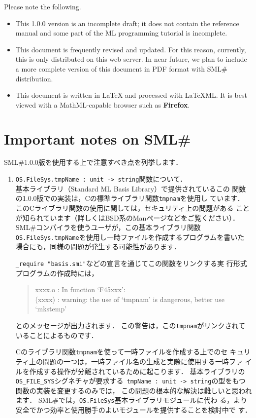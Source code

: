 \documentclass{jbook}
\newcommand{\txt}[2]{#2}
\newcommand{\smlsharp}{SML\#}
\newcommand{\version}{1.0.0}
\newenvironment{program}{\begin{tt}\begin{quote}}{\end{quote}\end{tt}}
\begin{document}
Please note the following.
\begin{itemize}
\item 
	This \version{} version is an incomplete draft;
it does not contain the reference manual and some part of the ML
programming tutorial is incomplete.

\item 
	This document is frequently revised and updated.
	For this reason, currently, this is only distributed on this web
server.
	In near future, we plan to include a more complete version of
this document in PDF format with \smlsharp{} distribution.

\item 
	This document is written in LaTeX and processed with LaTeXML.
	It is best viewed with a MathML-capable browser such as {\bf Firefox}.
\end{itemize}
\fi%

\chapter*{\txt{\smlsharp{}使用上の注意}{Important notes on \smlsharp{}}}

\ifx\jp%

\smlsharp{}\version{}版を使用する上で注意すべき点を列挙します．
\begin{enumerate}
\item  {\tt OS.FileSys.tmpName : unit -> string}関数について．\\
	基本ライブラリ（Standard ML Basis Library）で提供されているこの
関数の\version{}版での実装は，Cの標準ライブラリ関数{\tt tmpnam}を使用し
ています．
	このCライブラリ関数の使用に関しては，セキュリティ上の問題がある
ことが知られています（詳しくはBSD系のManページなどをご覧ください）．
	\smlsharp{}コンパイラを使うユーザが，この基本ライブラリ関数
{\tt OS.FileSys.tmpName}を使用し一時ファイルを作成するプログラムを書いた
場合にも，同様の問題が発生する可能性があります．
  
    {\tt \_require "basis.smi"}などの宣言を通じてこの関数をリンクする実
行形式プログラムの作成時には，
\begin{program}
xxxx.o : In function `F45xxx':\\
(xxxx) : warning: the use of `tmpnam' is dangerous, better use `mkstemp'
\end{program}      
とのメッセージが出力されます．
	この警告は，この{\tt tmpnam}がリンクされていることによるものです．
  
	Cのライブラリ関数{\tt tmpnam}を使って一時ファイルを作成する上でのセ
キュリティ上の問題の一つは，一時ファイル名の生成と実際に使用する一時ファ
イルを作成する操作が分離されているために起こります．
	基本ライブラリの{\tt OS\_FILE\_SYS}シグネチャが要求する{\tt
tmpName : unit -> string}の型をもつ関数の実装を変更するのみでは，
この問題の根本的な解決は難しいと思われます．
	\smlsharp{}では，{\tt OS.FileSys}基本ライブラリモジュールに代わ
る，より安全でかつ効率と使用勝手のよいモジュールを提供することを検討中で
す．
\end{enumerate}
\else%
\end{document}

